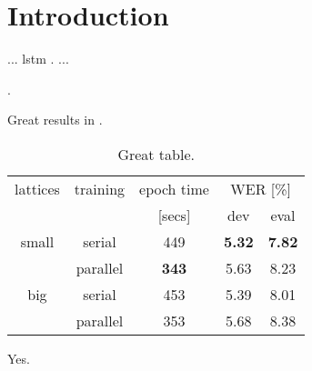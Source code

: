 
\chapter{Introduction}
...
\Gls{lstm} \cite{hochreiter1997lstm}.
...

\cite{zeyer2018:asr-attention}.

Great results in .

\begin{table}[t]
\centering
\caption{Great table.}
\label{tab:sth}
\begin{tabular}{|c|c|c|c|c|}
\hline
lattices & training & epoch time & \multicolumn{2}{c|}{WER [\%]} \\
{}       & {}       & [secs]  & dev & eval \\ \hline \hline
small    & serial & 449  & \textbf{5.32} & \textbf{7.82} \\ \cline{2-5}
{}       & parallel & \textbf{343}  & 5.63 & 8.23 \\ \hline \hline
big      & serial   &   453        & 5.39 & 8.01 \\ \cline{2-5}
{}       & parallel &   353        & 5.68 & 8.38 \\ \hline
\end{tabular}
\end{table}

Yes.


